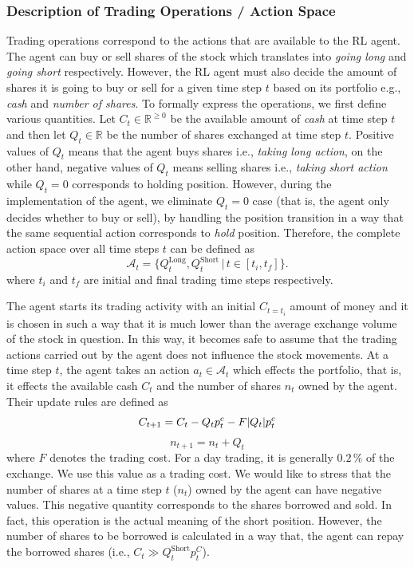 \documentclass[twocolumn,aps,pra,superscriptaddress,nofootinbib,longbibliography]{revtex4-2}
\begin{document}
\subsubsection{Description of Trading Operations / Action Space}
Trading operations correspond to the actions that are available to the RL agent. The agent can buy or sell shares of the stock which translates into \textit{going long} and \textit{going short} respectively.  However, the RL agent must also decide the amount of shares it is going to buy or sell for a given time step \(t\) based on its portfolio e.g., \textit{cash} and \textit{number of shares}. To formally express the operations, we first define various quantities. Let \(C_{t} \in \mathds{R}^{\geq 0}\) be the available amount of \textit{cash} at time step \(t\) and then let \(Q_t \in \mathds{R}\) be the number of shares exchanged at time step \(t\). Positive values of \(Q_t\) means that the agent buys shares i.e., \textit{taking long action}, on the other hand, negative values of \(Q_t\) means selling shares i.e., \textit{taking short action} while \(Q_t = 0\) corresponds to holding position. However, during the implementation of the agent, we eliminate \(Q_t = 0\) case (that is, the agent only decides whether to buy or sell), by handling the position transition in a way that the same sequential action corresponds to \textit{hold} position. Therefore, the complete action space over all time steps \(t\) can be defined as
\begin{equation}
    \mathcal{A}_t = \{Q^{\text{Long}}_{t}, Q^{\text{Short}}_{t} \,| \, t \in [t_i, t_f]\}.
\end{equation}
where \(t_i\) and \(t_f\) are initial and final trading time steps respectively.


The agent starts its trading activity with an initial \(C_{t=t_i}\) amount of money and it is chosen in such a way that it is much lower than the average exchange volume of the stock in question. In this way, it becomes safe to assume that the trading actions carried out by the agent does not influence the stock movements. At a time step \(t\), the agent takes an action \(a_t \in \mathcal{A}_t\) which effects the portfolio, that is, it effects the available cash \(C_t\) and the number of shares \(n_t\) owned by the agent. Their update rules are defined as
\begin{equation}\label{eq:portfolio-update}
    C_{t+1} = C_t - Q_t p_{t}^{c} - F \abs{Q_t} p_{t}^{c}
\end{equation}
\begin{equation}
    n_{t+1} = n_t + Q_t
\end{equation}
where \(F\) denotes the trading cost. For a day trading, it is generally \(0.2\,\%\) of the exchange. We use this value as a trading cost. We would like to stress that the number of shares at a time step \(t\) (\(n_t\)) owned by the agent can have negative values. This negative quantity corresponds to the shares borrowed and sold. In fact, this operation is the actual meaning of the short position. However, the number of shares to be borrowed is calculated in a way that, the agent can repay the borrowed shares (i.e., \(C_{t} \gg Q_t^{\text{Short}} p_t^{C}\)).  
\end{document}
